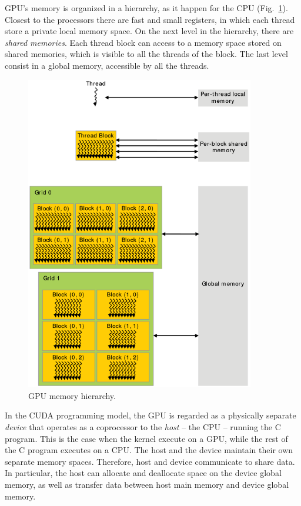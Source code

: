 GPU's memory is organized in a hierarchy, as it happen for the CPU (Fig.~\ref{fig:GPU-memory-hierarchy}). Closest to the processors there are fast and small registers, in which each thread store a private local memory space. On the next level in the hierarchy, there are \textit{shared memories}. Each thread block can access to a memory space stored on shared memories, which is visible to all the threads of the block. The last level consist in a global memory, accessible by all the threads.
\begin{figure}
   \centering
   \includegraphics[width=10cm]{Figs/GPU_memory_hierarchy.eps}
   \caption{GPU memory hierarchy.} \label{fig:GPU-memory-hierarchy}
\end{figure}

In the CUDA programming model, the GPU is regarded as a physically separate \textit{device} that operates as a coprocessor to the \textit{host} -- the CPU -- running the C program. This is the case when the kernel execute on a GPU, while the rest of the C program executes on a CPU. The host and the device maintain their own separate memory spaces. Therefore, host and device communicate to share data. In particular, the host can allocate and deallocate space on the device global memory, as well as transfer data between host main memory and device global memory.

